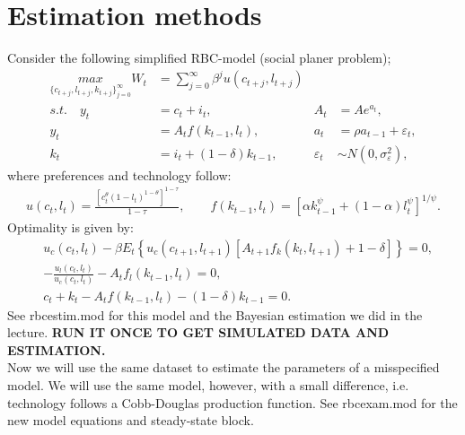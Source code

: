 \documentclass[10pt,a4paper]{article}
\begin{document}
\section{Estimation methods}
Consider the following simplified RBC-model (social planer problem);
\begin{align*}
  \underset{\{c_{t+j},l_{t+j},k_{t+j}\}_{j=0}^\infty}{max} W_t &= \sum_{j=0}^\infty \beta^j u(c_{t+j},l_{t+j})\\
  s.t.\quad y_t &= c_t + i_t, & A_t &= A e^{a_t}, \\
  y_t &= A_t f(k_{t-1},l_t), & a_t &= \rho a_{t-1} + \varepsilon_t,\\
  k_t &= i_t +(1-\delta)k_{t-1}, &  \varepsilon_t &\sim N(0,\sigma_{\varepsilon}^2),
\end{align*}
where preferences and technology follow:
\begin{align*}
  u(c_t,l_t)= \frac{\left[c_t^\theta (1-l_t)^{1-\theta}\right]^{1-\tau}}{1-\tau}, \qquad f(k_{t-1},l_t)=\left[\alpha k_{t-1}^\psi + (1-\alpha)l_t^\psi\right]^{1/\psi}.
\end{align*}
Optimality is given by:
\begin{eqnarray*}
 &u_c(c_t,l_t) - \beta E_t \left\{u_c(c_{t+1},l_{t+1}) \left[A_{t+1} f_k(k_t, l_{t+1})+1-\delta \right]\right\} = 0,\\
 & -\frac{u_l(c_t,l_t)}{u_c(c_t,l_t)}-A_t f_l(k_{t-1},l_t)=0,\\
 & c_t + k_t -A_t f(k_{t-1},l_t) -(1-\delta)k_{t-1}=0.
\end{eqnarray*}
See rbcestim.mod for this model and the Bayesian estimation we did in the lecture. \textbf{RUN IT ONCE TO GET SIMULATED DATA AND ESTIMATION.}\\  Now we will use the same dataset to estimate the parameters of a misspecified model. We will use the same model, however, with a small difference, i.e. technology follows a Cobb-Douglas production function. See rbcexam.mod for the new model equations and steady-state block.
\end{document}
